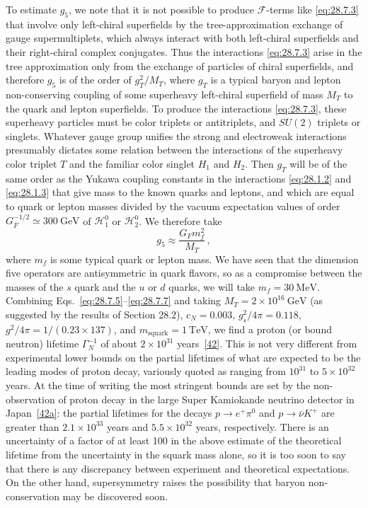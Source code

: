 To estimate \(g_5\), we note that it is not possible to produce
\(\mathcal F\)-terms like \eqref{eq:28.7.3} that involve only left-chiral
superfields by the tree-approximation exchange of gauge supermultiplets,
which always interact with both left-chiral superfields and their
right-chiral complex conjugates. Thus the interactions \eqref{eq:28.7.3}
arise in the tree approximation only from the exchange of particles of
chiral superfields, and therefore \(g_5\) is of the order of \(g_T^2/M_T\),
where \(g_T\) is a typical baryon and lepton non-conserving coupling of some
superheavy left-chiral superfield of mass \(M_T\) to the quark and lepton
superfields. To produce the interactions \eqref{eq:28.7.3}, these
superheavy particles must be color triplets or antitriplets, and \(SU(2)\)
triplets or singlets. Whatever gauge group unifies the strong and
electroweak interactions presumably dictates some relation between the
interactions of the superheavy color triplet \(T\) and the familiar color
singlet \(H_1\) and \(H_2\). Then \(g_T\) will be of the same order as the
Yukawa coupling constants in the interactions \eqref{eq:28.1.2} and
\eqref{eq:28.1.3} that give mass to the known quarks and leptons, and which
are equal to quark or lepton masses divided by the vacuum expectation
values of order \(G_F^{-1/2}\simeq300\ \mathrm{GeV}\) of
\(\mathcal H_1^0\) or \(\mathcal H_2^0\). We therefore take
\begin{equation}
  g_5\approx\frac{G_Fm_f^2}{M_T}\,,
  \tag{28.7.7}\label{eq:28.7.7}
\end{equation}
where \(m_f\) is some typical quark or lepton mass. We have seen that the
dimension five operators are antisymmetric in quark flavors, so as a
compromise between the masses of the \(s\) quark and the \(u\) or \(d\)
quarks, we will take \(m_f=30\ \mathrm{MeV}\). Combining
Eqs.~\eqref{eq:28.7.5}--\eqref{eq:28.7.7} and taking
\(M_T=2\times10^{16}\ \mathrm{GeV}\) (as suggested by the results of
Section 28.2), \(c_N=0.003\), \(g_s^2/4\pi=0.118\),
\(g^2/4\pi=1/(0.23\times137)\), and
\(m_{\mathrm{squark}}=1\ \mathrm{TeV}\), we find a proton (or bound
neutron) lifetime \(\Gamma_N^{-1}\) of about \(2\times10^{31}\)
years~\hyperref[ch28-ref-42]{[42]}. This is not very
different from experimental lower bounds on the partial lifetimes of what
are expected to be the leading modes of proton decay, variously quoted as
ranging from \(10^{31}\) to \(5\times10^{32}\) years. At the time of
writing the most stringent bounds are set by the non-observation of proton
decay in the large Super Kamiokande neutrino detector in
Japan~\hyperref[ch28-ref-42a]{[42a]}: the partial lifetimes
for the decays \(p\longrightarrow e^+\pi^0\) and
\(p\longrightarrow\bar\nu K^+\) are greater than
\(2.1\times10^{33}\) years and \(5.5\times10^{32}\) years, respectively.
There is an uncertainty of a factor of at least 100 in the above estimate
of the theoretical lifetime from the uncertainty in the squark mass alone,
so it is too soon to say that there is any discrepancy between experiment
and theoretical expectations. On the other hand, supersymmetry raises the
possibility that baryon non-conservation may be discovered soon.

